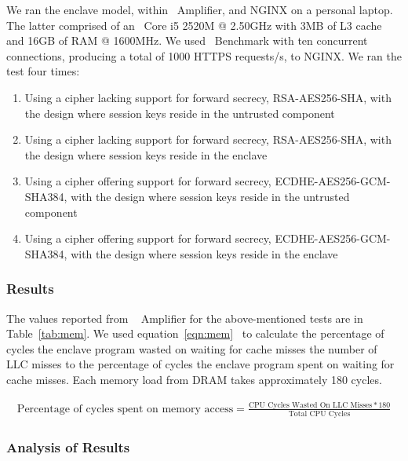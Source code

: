 \documentclass[../../../main.tex]{subfiles}
\begin{document}
We ran the enclave model, within \VTune~Amplifier, and NGINX on a
personal laptop. The latter comprised of an \Intel~Core i5 2520M @
2.50GHz with 3MB of L3 cache and 16GB of RAM @ 1600MHz. We used
\Apache~Benchmark with ten concurrent connections, producing a total
of 1000 HTTPS requests/s, to NGINX. We ran the test four times:
\begin{enumerate}
  \item Using a cipher lacking support for forward secrecy,
    RSA-AES256-SHA, with the design where session keys reside in the
    untrusted component
  \item Using a cipher lacking support for forward secrecy,
    RSA-AES256-SHA, with the design where session keys reside in the
    enclave
  \item Using a cipher offering support for forward secrecy,
    ECDHE-AES256-GCM-SHA384, with the design where session keys reside in
    the untrusted component
  \item Using a cipher offering support for forward secrecy,
    ECDHE-AES256-GCM-SHA384, with the design where session keys reside in
    the enclave
\end{enumerate}

\subsubsection*{Results}
The values reported from \VTune~ Amplifier for the above-mentioned
tests are in Table~\ref{tab:mem}. We used
equation~\ref{eqn:mem}~\cite{intel-eqn} to calculate the percentage of
cycles the enclave program wasted on waiting for cache misses the
number of LLC misses to the percentage of cycles the enclave program
spent on waiting for cache misses. Each memory load from DRAM takes
approximately 180 cycles.

\begin{table}[H]
  \label{tab:mem}
\end{table}
\begin{align}
 \label{eqn:mem}
 \text{Percentage of cycles spent on memory access} =
    \frac{\text{CPU Cycles Wasted On LLC Misses} * 180}{\text{Total CPU
    Cycles}}
\end{align}

\subsubsection*{Analysis of Results}
\end{document}
